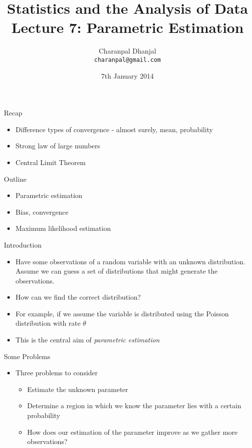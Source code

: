 \documentclass{beamer}
\title{Statistics and the Analysis of Data\\ Lecture 7: Parametric Estimation}
\author{Charanpal Dhanjal \\ \texttt{charanpal@gmail.com}}
\institute{\'{E}cole des Ponts}
\date{7th January 2014}
\begin{document}
\frame{\titlepage}

\begin{frame}{Recap}  
\begin{itemize} 
\item Difference types of convergence - almost surely, mean, probability 
\item Strong law of large numbers 
\item Central Limit Theorem 
\end{itemize}
\end{frame}

\begin{frame}{Outline}  
\begin{itemize} 
 \item Parametric estimation 
 \item Bias, convergence
 \item Maximum likelihood estimation
\end{itemize}
\end{frame}

\begin{frame}{Introduction}
\begin{itemize}
 \item Have some observations of a random variable with an unknown distribution. Assume we can guess a set of distributions that might generate the observations. 
 \item How can we find the correct distribution? 
 \item For example, if we assume the variable is distributed using the Poisson distribution with rate $\theta$ 
 \item This is the central aim of \emph{parametric estimation}
\end{itemize}
\end{frame}

\begin{frame}{Some Problems} 
\begin{itemize} 
 \item Three problems to consider 
 \begin{itemize} 
 \item Estimate the unknown parameter 
 \item Determine a region in which we know the parameter lies with a certain probability 
 \item How does our estimation of the parameter improve as we gather more observations? 
 \end{itemize} 
\end{itemize}
\end{frame}
\end{document}
